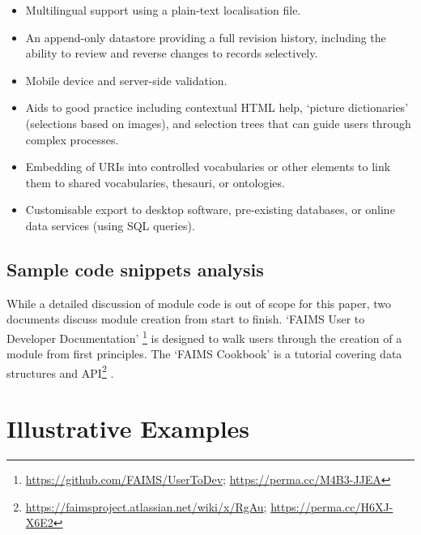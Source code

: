 \documentclass[preprint,12pt, a4paper]{elsarticle}
\begin{document}
\begin{itemize}
\item Multilingual support using a plain-text localisation file.
\item An append-only datastore providing a full revision history, including the ability to review and reverse changes to records selectively.
\item Mobile device and server-side validation.
\item Aids to good practice including contextual HTML help, `picture dictionaries' (selections based on images), and selection trees that can guide users through complex processes.
\item Embedding of URIs into controlled vocabularies or other elements to link them to shared vocabularies, thesauri, or ontologies.
\item Customisable export to desktop software, pre-existing databases, or online data services (using SQL queries).
\end{itemize}


\subsection{Sample code snippets analysis}


While a detailed discussion of module code is out of scope for this paper, two documents discuss module creation from start to finish. `FAIMS User to Developer Documentation' \footnote{\url{https://github.com/FAIMS/UserToDev}; \url{https://perma.cc/M4B3-JJEA}} is designed to walk users through the creation of a module from first principles. The `FAIMS Cookbook' is a tutorial covering data structures and API\footnote{\url{https://faimsproject.atlassian.net/wiki/x/RgAu}; \url{https://perma.cc/H6XJ-X6E2}} .

\section{Illustrative Examples}
\end{document}
